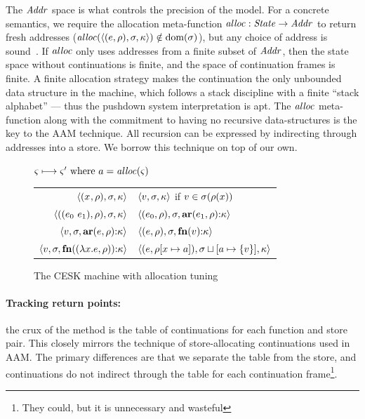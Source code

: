 The $\mathit{Addr}$ space is what controls the precision of the model.
%
For a concrete semantics, we require the allocation meta-function $\mathit{alloc} :
\mathit{State} \to \mathit{Addr}$ to return fresh addresses ($\mathit{alloc}(\langle (e,\rho),\sigma,\kappa \rangle) \notin \text{dom}(\sigma)$), but any choice of address is sound~\citep{dvanhorn:Might2009Posteriori}.
%
If $\mathit{alloc}$ only uses addresses from a finite subset of $\mathit{Addr}$, then the state space without continuations is finite, and the space of continuation frames is finite.
%
A finite allocation strategy makes the continuation the only unbounded data structure in the machine, which follows a stack discipline with a finite ``stack alphabet'' --- thus the pushdown system interpretation is apt.
%
The $\mathit{alloc}$ meta-function along with the commitment to having no recursive data-structures is the key to the AAM technique.
%
All recursion can be expressed by indirecting through addresses into a store.
%
We borrow this technique on top of our own.

\begin{figure}
  \centering
  $\varsigma \longmapsto \varsigma' \text{ where } a = \mathit{alloc}(\varsigma)$ \\
  \begin{tabular}{r|l}
    \hline
    $\langle (x^{{}}, \rho), \sigma, \kappa \rangle$
    &
    $\langle v,\sigma,\kappa \rangle$ if $v \in \sigma(\rho(x))$
    \\
    $\langle ((e_{0}\ e_{1}){}, \rho), \sigma, \kappa \rangle$
    &
    $\langle (e_{0}, \rho), \sigma, \mathbf{ar}{}(e_{1},\rho){\tt :} \kappa \rangle$
    \\
    $\langle v, \sigma, \mathbf{ar}{}(e,\rho){\tt :} \kappa \rangle$
    &
    $\langle (e, \rho), \sigma, \mathbf{fn}{}(v){\tt :} \kappa \rangle$
    \\
    $\langle v,\sigma,\mathbf{fn}{}((\lambda{} x. e, \rho)){\tt :} \kappa \rangle$
    &
    $\langle (e, \rho[x \mapsto a]), \sigma\sqcup[a \mapsto \{ v \}], \kappa \rangle$
  \end{tabular}
  \caption{The CESK machine with allocation tuning}
  \label{fig:base-semantics}
\end{figure}

\paragraph{Tracking return points:} the crux of the method is the table of continuations for each function and store pair.
%
This closely mirrors the technique of store-allocating continuations used in AAM.
%
The primary differences are that we separate the table from the store, and continuations do not indirect through the table for each continuation frame\footnote{They could, but it is unnecessary and wasteful}.

